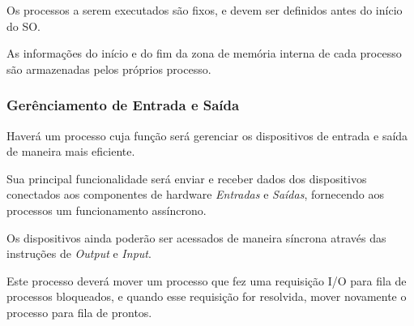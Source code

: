 Os processos a serem executados são fixos, e devem ser definidos antes do início do SO.

As informações do início e do fim da zona de memória interna de cada processo são armazenadas pelos próprios processo.

\subsubsection{Gerênciamento de Entrada e Saída}

Haverá um processo cuja função será gerenciar os dispositivos de entrada e saída de maneira mais eficiente.

Sua principal funcionalidade será enviar e receber dados dos dispositivos conectados aos componentes de hardware \textit{Entradas} e \textit{Saídas}, fornecendo aos processos um funcionamento assíncrono.

Os dispositivos ainda poderão ser acessados de maneira síncrona através das instruções de \textit{Output} e \textit{Input}.

Este processo deverá mover um processo que fez uma requisição I/O para fila de processos bloqueados, e quando esse requisição for resolvida, mover novamente o processo para fila de prontos.